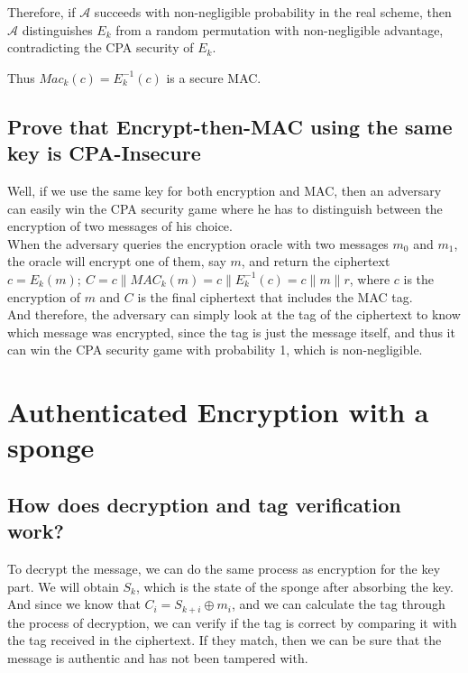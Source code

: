 \documentclass{article}
\begin{document}
Therefore, if $\mathcal A$ succeeds with non-negligible probability in the real scheme, then $\mathcal A$ distinguishes $E_k$ from a random permutation with non-negligible advantage, contradicting the CPA security of $E_k$.

Thus $Mac_k(c)=E_k^{-1}(c)$ is a secure MAC.

\subsection{Prove that Encrypt-then-MAC using the same key is CPA-Insecure}
Well, if we use the same key for both encryption and MAC, then an adversary can easily win the CPA security game where he has to distinguish between the encryption of two messages of his choice.\\
When the adversary queries the encryption oracle with two messages $m_0$ and $m_1$, the oracle will encrypt one of them, say $m$, and return the ciphertext $c = E_k(m);\ C = c \| MAC_k(m) = c \| E_k^{-1}(c) = c \| m \| r$, where $c$ is the encryption of $m$ and $C$ is the final ciphertext that includes the MAC tag.\\
And therefore, the adversary can simply look at the tag of the ciphertext to know which message was encrypted, since the tag is just the message itself, and thus it can win the CPA security game with probability 1, which is non-negligible.

\section{Authenticated Encryption with a sponge}
\subsection{How does decryption and tag verification work?}
To decrypt the message, we can do the same process as encryption for the key part. We will obtain $S_k$, which is the state of the sponge after absorbing the key.
And since we know that $C_i = S_{k+i} \oplus m_i$, and we can calculate the tag through the process of decryption, we can verify if the tag is correct by comparing it with the tag received in the ciphertext. If they match, then we can be sure that the message is authentic and has not been tampered with.
\end{document}
